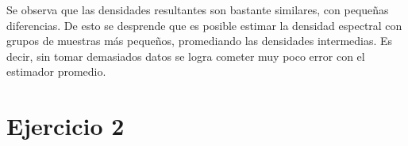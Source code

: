 Se observa que las densidades resultantes son bastante similares, con pequeñas diferencias. De esto se desprende que es posible estimar la densidad espectral con grupos de muestras más pequeños, promediando las densidades intermedias. Es decir, sin tomar demasiados datos se logra cometer muy poco error con el estimador promedio.

\newpage
\section*{Ejercicio 2}




